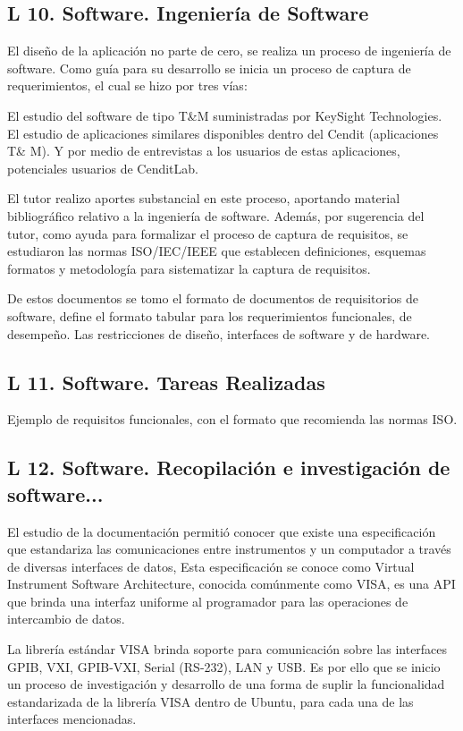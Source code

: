 \documentclass[paper=letter,oneside,fontsize=9pt]{scrartcl}
\begin{document}
	\subsection{L 10. Software. Ingeniería de Software}
	
	El diseño de la aplicación no parte de cero, se realiza un proceso de ingeniería de software. Como guía para su desarrollo se inicia un proceso de captura de requerimientos, el cual se hizo por tres vías: 
	
	El estudio del software de tipo T\&M suministradas por KeySight Technologies. 	
	El estudio de aplicaciones similares disponibles dentro del Cendit (aplicaciones T\& M). Y por medio de entrevistas a los usuarios de estas aplicaciones, potenciales usuarios de CenditLab.
	
	El tutor realizo aportes substancial en este proceso, aportando material bibliográfico relativo a la ingeniería de software. 
	Además, por sugerencia del tutor, como ayuda para formalizar el proceso de captura de requisitos, se estudiaron las normas ISO/IEC/IEEE que establecen 
	definiciones, esquemas formatos y metodología para sistematizar la captura de requisitos. 
	
	De estos documentos se tomo el formato de documentos de requisitorios de software, define el formato tabular para los requerimientos funcionales, de desempeño. Las restricciones de diseño, interfaces de software y de hardware.
	
	\subsection{L 11. Software. Tareas Realizadas}
	
	Ejemplo de requisitos funcionales, con el formato que recomienda las normas ISO.
	
	\subsection{L 12. Software. Recopilación e investigación de software...}
	
	El estudio de la documentación permitió conocer que existe una especificación que estandariza las comunicaciones entre instrumentos y un computador a través de diversas interfaces de datos, Esta especificación se conoce como Virtual Instrument Software Architecture, conocida comúnmente como VISA, es una API que brinda una interfaz uniforme al programador para las operaciones de intercambio de datos. 	
	
	La librería estándar VISA brinda soporte para comunicación sobre las interfaces GPIB, VXI, GPIB-VXI, Serial (RS-232), LAN y USB. Es por ello que se inicio un proceso de investigación y desarrollo de una forma de suplir la funcionalidad estandarizada de la librería VISA dentro de Ubuntu, para cada una de las interfaces mencionadas.	
	
\end{document}
